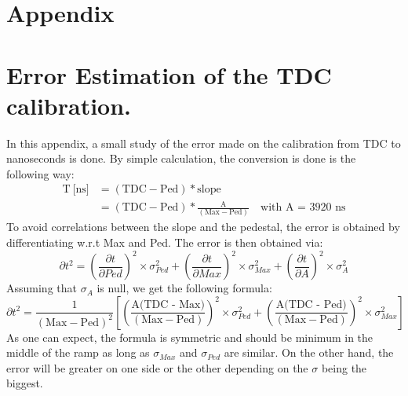 \documentclass[twoside,a4paper,11pt]{article}
\begin{document}
\clearpage
\begin{appendix}
\section*{Appendix}
\pagestyle{plain}
\renewcommand{\thetable}{A\arabic{table}}

\section{Error Estimation of the TDC calibration.}
\label{appendix:calib_error}

In this appendix, a small study of the error made on the calibration from TDC to nanoseconds is done. By simple calculation, the conversion is done is the following way:
\begin{equation*}
\begin{split}
\text{T} \: \text{[ns]} & = ( \text{TDC} - \text{Ped} ) * \text{slope} \\
& = ( \text{TDC} - \text{Ped} ) * \frac{\text{A}}{(\text{Max} - \text{Ped})} \quad \text{with A = 3920 ns}
\end{split}
\end{equation*}
To avoid correlations between the slope and the pedestal, the error is obtained by differentiating w.r.t Max and Ped. The error is then obtained via:
\begin{equation*}
\partial t^2 = \left(\frac{\partial t}{\partial Ped}\right)^2 \times \sigma_{Ped}^2 + \left(\frac{\partial t}{\partial Max}\right)^2 \times \sigma_{Max}^2 + \left(\frac{\partial t}{\partial A}\right)^2 \times \sigma_{A}^2
\end{equation*}
Assuming that $\sigma_{A}$ is null, we get the following formula:
\begin{equation*}
\partial t^2 = \frac{1}{(\text{Max} - \text{Ped})^2} \left[ \left( \frac{\text{A(TDC - Max)}}{(\text{Max} - \text{Ped})} \right)^2 \times \sigma_{Ped}^2 + \left( \frac{\text{A(TDC - Ped)}}{(\text{Max} - \text{Ped})} \right)^2 \times \sigma_{Max}^2 \right]
\end{equation*}
As one can expect, the formula is symmetric and should be minimum in the middle of the ramp as long as $\sigma_{Max}$ and $\sigma_{Ped}$ are similar. On the other hand, the error will be greater on one side or the other depending on the $\sigma$ being the biggest. 
\begin{figure}[htbp]

\end{figure}
\end{appendix}
\end{document}
